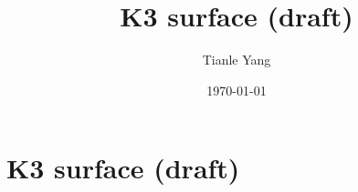 \documentclass{noteformyself}
\title{K3 surface (draft)}
\author{Tianle Yang}
\date{\today}
\begin{document}
    \maketitle

    \section{K3 surface (draft)}



\end{document}
